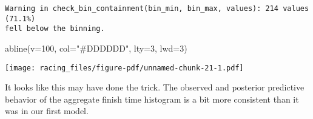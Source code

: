 \documentclass[
  letterpaper,
  DIV=11,
  numbers=noendperiod]{scrartcl}
\newenvironment{Shaded}{\begin{snugshade}}{\end{snugshade}}
\newcommand{\AttributeTok}[1]{\textcolor[rgb]{0.40,0.45,0.13}{#1}}
\newcommand{\DecValTok}[1]{\textcolor[rgb]{0.68,0.00,0.00}{#1}}
\newcommand{\FunctionTok}[1]{\textcolor[rgb]{0.28,0.35,0.67}{#1}}
\newcommand{\NormalTok}[1]{\textcolor[rgb]{0.00,0.23,0.31}{#1}}
\newcommand{\OtherTok}[1]{\textcolor[rgb]{0.00,0.23,0.31}{#1}}
\newcommand{\SpecialCharTok}[1]{\textcolor[rgb]{0.37,0.37,0.37}{#1}}
\newcommand{\StringTok}[1]{\textcolor[rgb]{0.13,0.47,0.30}{#1}}
\begin{document}
\begin{Shaded}
\end{Shaded}

\begin{verbatim}
Warning in check_bin_containment(bin_min, bin_max, values): 214 values (71.1%)
fell below the binning.
\end{verbatim}

\begin{Shaded}
\begin{Highlighting}[]
\FunctionTok{abline}\NormalTok{(}\AttributeTok{v=}\DecValTok{100}\NormalTok{, }\AttributeTok{col=}\StringTok{"\#DDDDDD"}\NormalTok{, }\AttributeTok{lty=}\DecValTok{3}\NormalTok{, }\AttributeTok{lwd=}\DecValTok{3}\NormalTok{)}
\end{Highlighting}
\end{Shaded}

\texttt{[image: racing\_files/figure-pdf/unnamed-chunk-21-1.pdf]}

It looks like this may have done the trick. The observed and posterior
predictive behavior of the aggregate finish time histogram is a bit more
consistent than it was in our first model.
\end{document}

